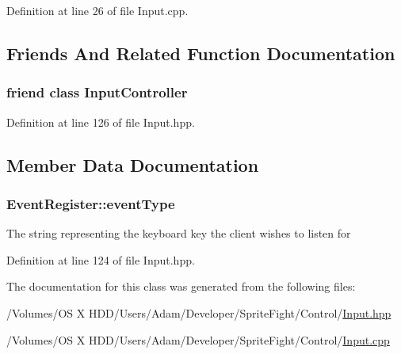 Definition at line 26 of file Input.\-cpp.



\subsection{Friends And Related Function Documentation}
\hypertarget{class_event_register_a083d5a8d8c2dd3a28d1f55d2965db0ab}{
\subsubsection[{Input\-Controller}]{\setlength{\rightskip}{0pt plus 5cm}friend class {\bf Input\-Controller}\hspace{0.3cm}{\ttfamily [friend]}}}\label{class_event_register_a083d5a8d8c2dd3a28d1f55d2965db0ab}


Definition at line 126 of file Input.\-hpp.



\subsection{Member Data Documentation}
\hypertarget{class_event_register_a0b6153036279b1189d7349d4f97632a9}{
\subsubsection[{event\-Type}]{ Event\-Register\-::event\-Type\hspace{0.3cm}{\ttfamily [protected]}}}\label{class_event_register_a0b6153036279b1189d7349d4f97632a9}
The string representing the keyboard key the client wishes to listen for 

Definition at line 124 of file Input.\-hpp.



The documentation for this class was generated from the following files\-:\begin{DoxyCompactItemize}
\item 
/\-Volumes/\-O\-S X H\-D\-D/\-Users/\-Adam/\-Developer/\-Sprite\-Fight/\-Control/\hyperlink{_input_8hpp}{Input.\-hpp}\item 
/\-Volumes/\-O\-S X H\-D\-D/\-Users/\-Adam/\-Developer/\-Sprite\-Fight/\-Control/\hyperlink{_input_8cpp}{Input.\-cpp}\end{DoxyCompactItemize}
